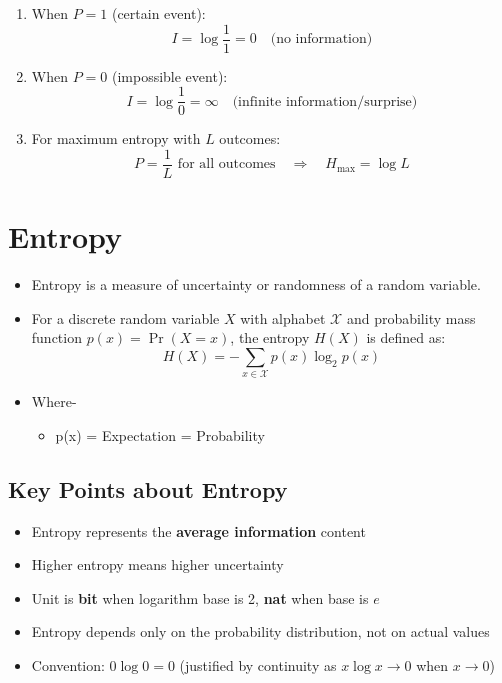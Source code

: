 \documentclass[11pt,a4paper]{book}
\newenvironment{definitionbox}[1][Definition]{
    \begin{tcolorbox}[
        enhanced,
        breakable,
        colback=primaryblue!10,
        colframe=primaryblue!150,
        title=#1,
        fonttitle=\bfseries,
        sharp corners,
        boxrule=0.8pt,
        left=8pt,
        right=8pt,
        top=6pt,
        bottom=6pt
    ]
}{
    \end{tcolorbox}
}
\newenvironment{formulabox}[1][Formula]{
    \begin{tcolorbox}[
        enhanced,
        breakable,
        colback=softcoral!10,
        colframe=softcoral!200,
        title=#1,
        fonttitle=\bfseries,
        coltitle=white,
        sharp corners,
        boxrule=1pt,
        left=8pt,
        right=8pt,
        top=6pt,
        bottom=6pt
    ]
}{
    \end{tcolorbox}
}
\begin{document}
\begin{formulabox}[Extreme Cases]
    \begin{enumerate}
        \item When \(P = 1\) (certain event):
        \[
        I = \log \frac{1}{1} = 0 \quad \text{(no information)}
        \]
        
        \item When \(P = 0\) (impossible event):
        \[
        I = \log \frac{1}{0} = \infty \quad \text{(infinite information/surprise)}
        \]
        
        \item For maximum entropy with \(L\) outcomes:
        \[
        P = \frac{1}{L} \text{ for all outcomes} \quad \Rightarrow \quad H_{\max} = \log L
        \]
    \end{enumerate}
\end{formulabox}

\section{Entropy}

\begin{definitionbox}[Entropy]
    \begin{itemize}
        \item Entropy is a measure of uncertainty or randomness of a random variable.
        \item For a discrete random variable \(X\) with alphabet \(\mathcal{X}\) and probability mass function \(p(x) = \Pr(X = x)\), the entropy \(H(X)\) is defined as:
    \[
    H(X) = -\sum_{x \in \mathcal{X}} p(x) \log_2 p(x)
    \]
    \item Where-
    \begin{itemize}
        \item p(x) = Expectation = Probability
    \end{itemize}
    \end{itemize}
\end{definitionbox}

\subsection{Key Points about Entropy}
\begin{itemize}
        \item Entropy represents the \textbf{average information} content
        \item Higher entropy means higher uncertainty
        \item Unit is \textbf{bit} when logarithm base is 2, \textbf{nat} when base is \(e\)
        \item Entropy depends only on the probability distribution, not on actual values
        \item Convention: \(0 \log 0 = 0\) (justified by continuity as \(x \log x \to 0\) when \(x \to 0\))
    \end{itemize}
\end{document}

